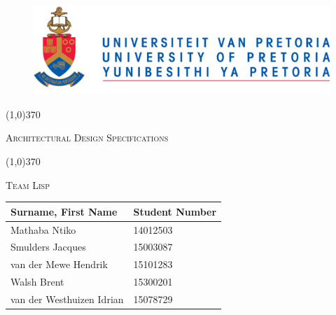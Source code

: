\documentclass[english]{article}
\begin{document}
	
	\begin{figure}
		\includegraphics[width=\linewidth]{up_logo.png}
	\end{figure}
	
	\begin{center}
	 \line(1,0){370}
	\\[0.2cm]
    {\scshape\Large Architectural Design Specifications  \par}
	\vspace{0.1cm}
	\line(1,0){370}
	\\[0.8cm]
	
	 {\scshape\Large Team Lisp \par}
	\vspace{0.9cm}
	
	\begin{tabu} to \textwidth { X[l] X[l]}
		\hline
		\textbf{Surname, First Name  }	& \textbf{Student Number}	\\ \hline \hline
		Mathaba	Ntiko   &14012503	\\ \hline
		Smulders	Jacques  &15003087		\\ \hline
		van der Mewe	Hendrik   &15101283		\\ \hline
		Walsh     Brent    &15300201		\\ \hline
		van der Westhuizen	Idrian    &15078729		\\ \hline
		\hline
	\end{tabu}
	
	\end{center}
	
	
	\newpage
	\tableofcontents

	\newpage
	
\end{document}
